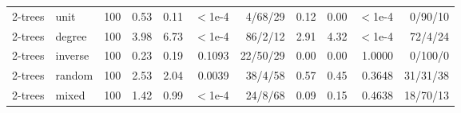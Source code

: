 \begin{table}[t]
\begin{tabular}{llrrrrrrrrr}
2-trees & unit & 100 & 0.53 & 0.11 & $<$1e-4 & 4/68/29 & 0.12 & 0.00 & $<$1e-4 & 0/90/10 \\
2-trees & degree & 100 & 3.98 & 6.73 & $<$1e-4 & 86/2/12 & 2.91 & 4.32 & $<$1e-4 & 72/4/24 \\
2-trees & inverse & 100 & 0.23 & 0.19 & 0.1093 & 22/50/29 & 0.00 & 0.00 & 1.0000 & 0/100/0 \\
2-trees & random & 100 & 2.53 & 2.04 & 0.0039 & 38/4/58 & 0.57 & 0.45 & 0.3648 & 31/31/38 \\
2-trees & mixed & 100 & 1.42 & 0.99 & $<$1e-4 & 24/8/68 & 0.09 & 0.15 & 0.4638 & 18/70/13 \\
\bottomrule
\end{tabular}
\end{table}
